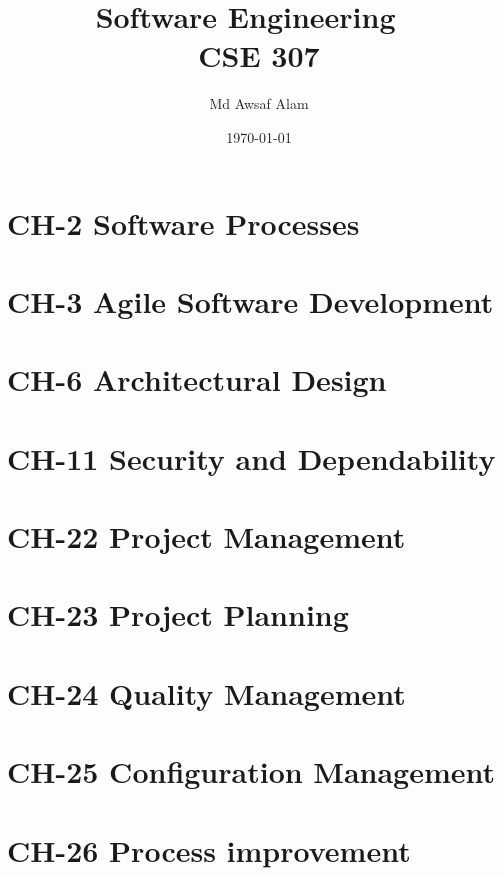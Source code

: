 \documentclass{book}
\title{Software Engineering ~\textbf{\\CSE 307}}
\author{Md Awsaf Alam}
\date{\today}
\begin{document}
\maketitle

\tableofcontents

\chapter{CH-2 Software Processes}


\chapter{CH-3 Agile Software Development}


\chapter{CH-6 Architectural Design}



\chapter{CH-11 Security and Dependability}


\chapter{CH-22 Project Management}


\chapter{CH-23 Project Planning}


\chapter{CH-24 Quality Management}


\chapter{CH-25 Configuration Management}

\chapter{CH-26 Process improvement}
\end{document}
